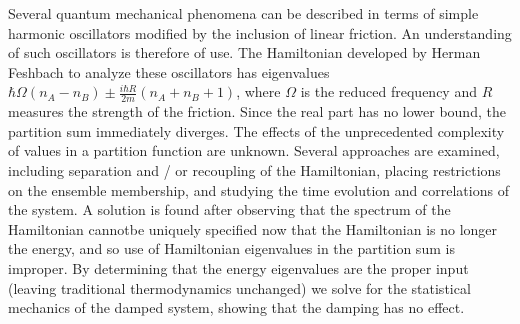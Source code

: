 Several quantum mechanical phenomena can be described in terms of simple
harmonic oscillators modified by the inclusion of linear friction.  An
understanding of such oscillators is therefore of use.  The Hamiltonian
developed by Herman Feshbach \cite{ft:fest} to analyze these oscillators
has eigenvalues $\hbar \Omega (n_{A} - n_{B}) \pm \frac{i \hbar R}{2 m}
(n_{A} + n_{B} + 1)$, where $\Omega$ is the reduced frequency and $R$ measures
the strength of the friction.  Since the real part has no lower bound, the
partition sum immediately diverges.  The effects of the unprecedented
complexity of values in a partition function are unknown.  Several approaches
are examined, including separation and / or recoupling of the Hamiltonian,
placing restrictions on the ensemble membership, and studying the time
evolution and correlations of the system.
A solution is found after observing that the spectrum of the Hamiltonian cannotbe uniquely specified now that the Hamiltonian is no longer the energy, and so
use of Hamiltonian eigenvalues in the partition sum is improper.  By
determining that the energy eigenvalues are the proper input (leaving
traditional thermodynamics unchanged) we solve for the statistical mechanics
of the damped system, showing that the damping has no effect.
